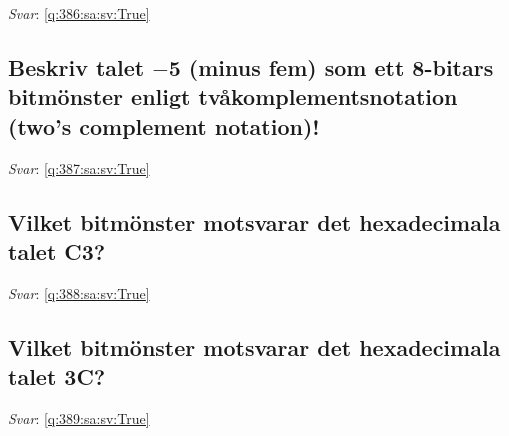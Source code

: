 \documentclass[a4paper,11pt,oneside]{article}
\begin{document}
\begin{sloppypar}
\vspace{2cm}

\noindent\makebox[\textwidth]{\hrulefill}

\vspace{1cm}

\textit{Svar}: \autoref{q:386:sa:sv:True}



\subsection{Beskriv talet \ensuremath{-}5 (minus fem) som ett 8-bitars bitm\"onster enligt tv\r{a}komplementsnotation (two{\textquoteright}s complement notation)!}

\label{q:387:sa:sv:False}

\vspace{2cm}

\noindent\makebox[\textwidth]{\hrulefill}

\vspace{1cm}

\textit{Svar}: \autoref{q:387:sa:sv:True}



\subsection{Vilket bitm\"onster motsvarar det hexadecimala talet C3?}

\label{q:388:sa:sv:False}

\vspace{2cm}

\noindent\makebox[\textwidth]{\hrulefill}

\vspace{1cm}

\textit{Svar}: \autoref{q:388:sa:sv:True}



\subsection{Vilket bitm\"onster motsvarar det hexadecimala talet 3C?}

\label{q:389:sa:sv:False}

\vspace{2cm}

\noindent\makebox[\textwidth]{\hrulefill}

\vspace{1cm}

\textit{Svar}: \autoref{q:389:sa:sv:True}




\end{sloppypar}
\end{document}
